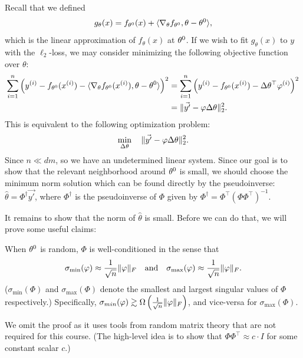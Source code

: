 Recall that we defined
\begin{align}
    g_\theta(x) = f_{\theta^{0}}(x) + \langle\nabla_\theta f_{\theta^{0}}, \theta - \theta^{0}\rangle,
\end{align}
which is the linear approximation of $f_\theta(x)$ at $\theta^{0}$. If we wish to fit $g_\theta(x)$ to $y$ with the $\ell_2$-loss, we may consider minimizing the following objective function over $\theta$:
\begin{align}
\sum_{i=1}^n \left( y^{(i)} - f_{\theta^{0}}(x^{(i)}) - \langle \nabla_\theta f_{\theta^{0}}(x^{(i)}), \theta - \theta^{0} \rangle \right)^2 
&=  \sum_{i=1}^n \left(y^{(i)} - f_{\theta^{0}}(x^{(i)}) - \Delta\theta^\top \varphi^{(i)} \right)^2 \\
&=  \|\vec{y'} - \varphi \Delta\theta\|_2^2.
\end{align}
This is equivalent to the following optimization problem:
\begin{align}
    \min_{\Delta \theta} \quad \|\vec{y'} - \varphi \Delta\theta\|_2^2. \label{lec12:eqn:opt-problem}
\end{align}
Since $n \ll dm$, so we have an undetermined linear system. Since our goal is to show that the relevant neighborhood around $\theta^{0}$ is small, we should choose the minimum norm solution which can be found directly by the pseudoinverse: $\hat{\theta} = \Phi^\dagger \vec{y'}$,  where $\Phi^\dagger$ is the pseudoinverse of $\Phi$ given by $\Phi^\dagger = \Phi^\top (\Phi \Phi^\top)^{-1}$.

It remains to show that the norm of $\hat{\theta}$ is small. Before we can do that, we will prove some useful claims:

\begin{lemma}\label{lec12:lem:claim1}
When $\theta^{0}$ is random, $\Phi$ is well-conditioned in the sense that \begin{align}
\sigma_{\min}(\varphi) \approx \frac{1}{\sqrt{n}} \|\varphi\|_F \quad \text{and} \quad
\sigma_{\max}(\varphi) \approx \frac{1}{\sqrt{n}} \|\varphi\|_F.
\end{align}
($\sigma_{\min}(\Phi)$ and $\sigma_{\max}(\Phi)$ denote the smallest and largest singular values of $\Phi$ respectively.) Specifically, $\sigma_{min}(\varphi) \gtrsim \Omega \left( \frac{1}{\sqrt{n}} \|\varphi\|_F \right)$, and vice-versa for $\sigma_{\max}(\Phi)$.
\end{lemma}

We omit the proof as it uses tools from random matrix theory that are not required for this course. (The high-level idea is to show that $\Phi \Phi^\top \approx c \cdot I$ for some constant scalar $c$.)

